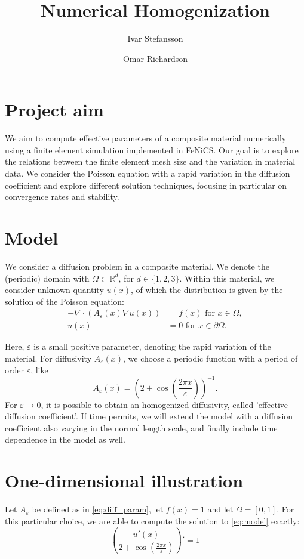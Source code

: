 \documentclass{article}
\title{Numerical Homogenization}\author[1]{Ivar Stefansson}
\author[2]{Omar Richardson}
\affil[1]{Department of Mathematics and Computer Science, Karlstad University}
\affil[2]{Department of Mathematics, University of Bergen}
\renewcommand{\epsilon}{\varepsilon}
\newcommand{\R}{\mathbb{ R}}
\begin{document}
\maketitle
\section{Project aim}
\label{sec:project_aim}

We aim to compute effective parameters of a composite material numerically using a finite element simulation implemented in FeNiCS.
Our goal is to explore the relations between the finite element mesh size and the variation in material data.
We consider the Poisson equation with a rapid variation in the diffusion coefficient and explore different solution techniques, focusing in particular on convergence rates and stability.

\section{Model}
\label{sec:model}
We consider a diffusion problem in a composite material. We denote the (periodic) domain with $\Omega \subset \R^d$, for $d\in\{1,2,3\}$. Within this material, we consider unknown quantity $u(x)$, of which the distribution is given by the solution of the Poisson equation:
\begin{equation}
    \begin{split}
        -\nabla \cdot (A_\epsilon(x)\nabla u(x)) &= f(x) \mbox{ for } x \in \Omega,\\
        u(x) &= 0 \mbox{ for } x \in \partial\Omega.
    \end{split}
    \label{eq:model}
\end{equation}

Here, $\epsilon$ is a small positive parameter, denoting the rapid variation of the material.
For diffusivity $A_\epsilon(x)$, we choose a periodic function with a period of order $\epsilon$, like
$$$$
\begin{equation}
   A_\epsilon(x) = \left( 2+\cos\left(\frac{2\pi x}{\epsilon}\right) \right)^{-1}.
   \label{eq:diff_param}
\end{equation}
For $\epsilon \to 0$, it is possible to obtain an homogenized diffusivity, called 'effective diffusion coefficient'.
If time permits, we will extend the model with a diffusion coefficient also varying in the normal length scale, and finally include time dependence in the model as well.

\section{One-dimensional illustration}
\label{sec:onedim}
Let $A_\epsilon$ be defined as in \eqref{eq:diff_param}, let $f(x) = 1$ and let $\Omega = [0,1]$. For this particular choice, we are able to compute the solution to \eqref{eq:model} exactly:
\begin{equation}
    \left( \frac{u'(x)}{2+\cos \left( \frac{2\pi x}{\epsilon} \right)} \right)' = 1
    \label{eq:one_dim}
\end{equation}
\end{document}
